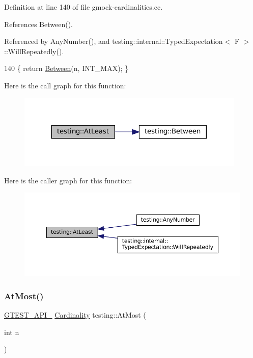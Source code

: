 Definition at line 140 of file gmock-\/cardinalities.\+cc.



References Between().



Referenced by Any\+Number(), and testing\+::internal\+::\+Typed\+Expectation$<$ F $>$\+::\+Will\+Repeatedly().


\begin{DoxyCode}
140 \{ \textcolor{keywordflow}{return} \hyperlink{namespacetesting_a3bb2d3cdd3fdf5b4be1480fce549918e}{Between}(n, INT\_MAX); \}
\end{DoxyCode}
Here is the call graph for this function\+:
\nopagebreak
\begin{figure}[H]
\begin{center}
\leavevmode
\includegraphics[width=308pt]{namespacetesting_a137297cb3c582843989fbd937cf0fed2_cgraph}
\end{center}
\end{figure}
Here is the caller graph for this function\+:
\nopagebreak
\begin{figure}[H]
\begin{center}
\leavevmode
\includegraphics[width=350pt]{namespacetesting_a137297cb3c582843989fbd937cf0fed2_icgraph}
\end{center}
\end{figure}
\mbox{\label{namespacetesting_a5487cd1068c78821ced96fbf542a91bb}} 
\subsubsection{\texorpdfstring{At\+Most()}{AtMost()}}
{\footnotesize\ttfamily \hyperlink{gtest-port_8h_aa73be6f0ba4a7456180a94904ce17790}{G\+T\+E\+S\+T\+\_\+\+A\+P\+I\+\_\+} \hyperlink{classtesting_1_1Cardinality}{Cardinality} testing\+::\+At\+Most (\begin{DoxyParamCaption}\item[{int}]{n }\end{DoxyParamCaption})}



